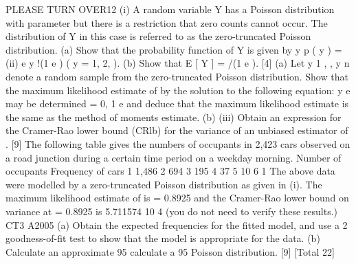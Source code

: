 PLEASE TURN OVER12
(i)
A random variable Y has a Poisson distribution with parameter but there is a
restriction that zero counts cannot occur. The distribution of Y in this case is
referred to as the zero-truncated Poisson distribution.
(a)
Show that the probability function of Y is given by
y
p ( y ) =
(ii)
e
y !(1 e )
( y = 1, 2, ).
(b) Show that E [ Y ] = /(1 e ).
[4]
(a) Let y 1 , , y n denote a random sample from the zero-truncated Poisson
distribution.
Show that the maximum likelihood estimate of
by the solution to the following equation:
y
e
may be determined
= 0,
1 e
and deduce that the maximum likelihood estimate is the same as the
method of moments estimate.
(b)
(iii)
Obtain an expression for the Cramer-Rao lower bound (CRlb) for the
variance of an unbiased estimator of .
[9]
The following table gives the numbers of occupants in 2,423 cars observed on
a road junction during a certain time period on a weekday morning.
Number of occupants
Frequency of cars
1
1,486
2
694
3
195
4
37
5
10
6
1
The above data were modelled by a zero-truncated Poisson distribution as
given in (i).
The maximum likelihood estimate of is = 0.8925 and the Cramer-Rao
lower bound on variance at = 0.8925 is 5.711574 10 4 (you do not need to
verify these results.)
CT3 A2005
(a) Obtain the expected frequencies for the fitted model, and use a 2
goodness-of-fit test to show that the model is appropriate for the data.
(b) Calculate an approximate 95%
calculate a 95%
Poisson distribution.
[9]
[Total 22]

